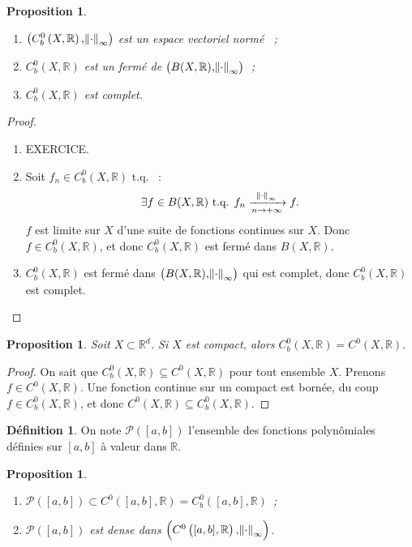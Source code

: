 \documentclass{report}
\newtheorem{prp}[thm]{Proposition}
\theoremstyle{definition}
\newtheorem{déf}[thm]{Définition}
\theoremstyle{remark}
\numberwithin{equation}{section}
\newcommand{\R}{\mathbb R}
\newcommand{\tq}{\text{ t.q. }}
\newcommand{\evfn}[3]{\left(#1\left(#2, #3\right), \norm {\cdot}_{\infty}\right)}
\newcommand{\evnC}[3]{{\evfn {C^{#1}}{#2}{#3}}}
\newcommand{\evnCb}[3]{{\evfn {C_b^{#1}}{#2}{#3}}}
\newcommand{\pinfty}{{+\infty}}
\newcommand{\evn}{espace vectoriel normé }
\begin{document}
		\begin{prp}~
		\begin{enumerate}
			\item $\evnCb0X\R$ est un \evn~;
			\item $C^0_b(X, \R)$ est un fermé de $\left(B(X, \R), \norm \cdot_\infty\right)$~;
			\item $C^0_b(X, \R)$ est complet.
		\end{enumerate}
		\end{prp}

		\begin{proof}~
		\begin{enumerate}
			\item EXERCICE.
			\item Soit $f_n \in C^0_b(X, \R) \tq$~:
			\begin{equation}
				\exists f \in B(X, \R) \tq f_n \xrightarrow[n \to \pinfty]{\norm \cdot_\infty} f.
			\end{equation}
			$f$ est limite sur $X$ d'une suite de fonctions continues sur $X$. Donc $f \in C^0_b(X, \R)$, et donc $C^0_b(X, \R)$ est fermé dans $B(X, \R)$.
			\item $C^0_b(X, \R)$ est fermé dans $\left(B(X, \R), \norm \cdot_\infty\right)$ qui est complet, donc $C^0_b(X, \R)$ est complet.
		\end{enumerate}
		\end{proof}

		\begin{prp} Soit $X \subset \R^d$. Si $X$ est compact, alors $C_b^0(X, \R) = C^0(X, \R)$.
		\end{prp}

		\begin{proof} On sait que $C^0_b(X, \R) \subseteq C^0(X, \R)$ pour tout ensemble $X$. Prenons $f \in C^0(X, \R)$. Une fonction continue sur un compact
		est bornée, du coup $f \in C^0_b(X, \R)$, et donc $C^0(X, \R) \subseteq C^0_b(X, \R)$.
		\end{proof}

		\begin{déf} On note $\mathcal P([a, b])$ l'ensemble des fonctions polynômiales définies sur $[a, b]$ à valeur dans $\R$.
		\end{déf}

		\begin{prp}~
		\begin{enumerate}
			\item $\mathcal P([a, b]) \subset C^0([a, b], \R) = C^0_b([a, b], \R)$~;
			\item $\mathcal P([a, b])$ est dense dans $\evnC0{[a, b]}\R$.
		\end{enumerate}
		\end{prp}
\end{document}
